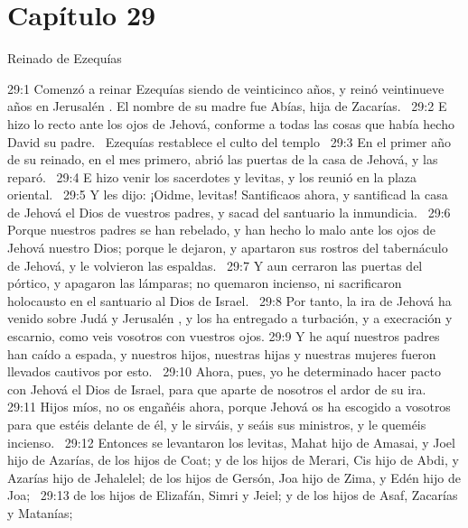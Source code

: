 																												\section*{Capítulo 29}
																													Reinado de Ezequías  
																													
																													
																													29:1 Comenzó a reinar Ezequías siendo de veinticinco años, y reinó veintinueve años en Jerusalén . El nombre de su madre fue Abías, hija de Zacarías.  
																													29:2 E hizo lo recto ante los ojos de Jehová, conforme a todas las cosas que había hecho David su padre.  
																													Ezequías restablece el culto del templo  
																													29:3 En el primer año de su reinado, en el mes primero, abrió las puertas de la casa de Jehová, y las reparó.  
																													29:4 E hizo venir los sacerdotes y levitas, y los reunió en la plaza oriental.  
																													29:5 Y les dijo: ¡Oidme, levitas! Santificaos ahora, y santificad la casa de Jehová el Dios de vuestros padres, y sacad del santuario la inmundicia.  
																													29:6 Porque nuestros padres se han rebelado, y han hecho lo malo ante los ojos de Jehová nuestro Dios; porque le dejaron, y apartaron sus rostros del tabernáculo de Jehová, y le volvieron las espaldas.  
																													29:7 Y aun cerraron las puertas del pórtico, y apagaron las lámparas; no quemaron incienso, ni sacrificaron holocausto en el santuario al Dios de Israel.  
																													29:8 Por tanto, la ira de Jehová ha venido sobre Judá y Jerusalén , y los ha entregado a turbación, y a execración y escarnio, como veis vosotros con vuestros ojos. 
																													29:9 Y he aquí nuestros padres han caído a espada, y nuestros hijos, nuestras hijas y nuestras mujeres fueron llevados cautivos por esto.  
																													29:10 Ahora, pues, yo he determinado hacer pacto con Jehová el Dios de Israel, para que aparte de nosotros el ardor de su ira.  
																													29:11 Hijos míos, no os engañéis ahora, porque Jehová os ha escogido a vosotros para que estéis delante de él, y le sirváis, y seáis sus ministros, y le queméis incienso.  
																													29:12 Entonces se levantaron los levitas, Mahat hijo de Amasai, y Joel hijo de Azarías, de los hijos de Coat; y de los hijos de Merari, Cis hijo de Abdi, y Azarías hijo de Jehalelel; de los hijos de Gersón, Joa hijo de Zima, y Edén hijo de Joa;  
																													29:13 de los hijos de Elizafán, Simri y Jeiel; y de los hijos de Asaf, Zacarías y Matanías;  
